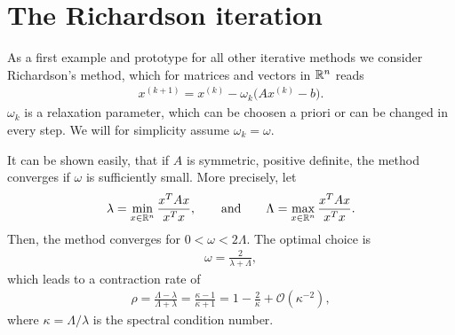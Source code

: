 
\section{The Richardson iteration}

\begin{intro}
  As a first example and prototype for all other iterative methods we
  consider Richardson's method, which for matrices and vectors in
  $\mathbb R^n$ reads
  \begin{gather}
    \label{eq:richardson:1}
    x^{(k+1)} = x^{(k)} - \omega_k \bigl(A x^{(k)} - b \bigr).
  \end{gather}
  $\omega_k$ is a relaxation parameter, which can be choosen a priori
  or can be changed in every step. We will for simplicity assume
  $\omega_k = \omega$.
  
  It can be shown easily, that if $A$ is symmetric, positive definite,
  the method converges if $\omega$ is sufficiently small. More
  precisely, let
  \begin{gather}
    \label{eq:richardson:3}
    \lambda = \min_{x\in \mathbb R^n} \frac{x^TAx}{x^Tx},
    \qquad\text{and}\qquad
    \Lambda = \max_{x\in \mathbb R^n} \frac{x^TAx}{x^Tx}.
  \end{gather}
  Then, the method converges for $0 < \omega < 2\Lambda$. The optimal
  choice is
  \begin{gather}
    \label{eq:richardson:2}
    \omega = \frac{2}{\lambda+\Lambda},
  \end{gather}
  which leads to a contraction rate of
  \begin{gather}
    \label{eq:richardson:4}
    \rho = \frac{\Lambda-\lambda}{\Lambda+\lambda} =
    \frac{\kappa-1}{\kappa+1} = 1 -\frac2\kappa + \mathcal
    O(\kappa^{-2}),
  \end{gather}
  where $\kappa = \Lambda/\lambda$ is the spectral condition number. 
\end{intro}


